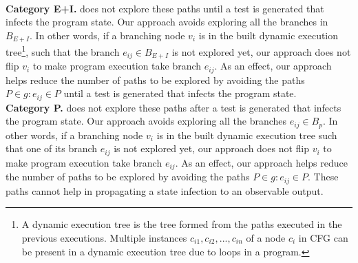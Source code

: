 \\ \textbf{Category E+I.}  does not explore these paths until a test 
is generated that infects the program state. Our approach avoids exploring all the branches in $B_{E+I}$. In other words, if a branching node $v_i$ is in the built dynamic execution tree\footnote{\scriptsize{A dynamic execution tree is the tree formed from the paths executed in the previous executions. Multiple instances $c_{i1}, c_{i2}, ..., c_{in}$ of a node $c_i$ in CFG can be present in a dynamic execution tree due to loops in a program.}}, such that the branch $e_{ij} \in B_{E+I}$ is not explored yet, our approach does not flip $v_i$ to make program execution take branch $e_{ij}$.
As an effect, our approach helps reduce the number of paths to be explored by avoiding the paths $P \in g : e_{ij} \in P$ until a test is generated that infects the program state.
\\ \textbf{Category P. }
 does not explore these paths after a test is generated that infects the program state.
Our approach avoids exploring all the branches 
$e_{ij}\in B_p$. In other words, if a branching node $v_i$ is in the built dynamic execution tree such that one of its branch $e_{ij}$ is not explored yet, our approach does not flip $v_i$ to make program execution take branch $e_{ij}$.
As an effect, our approach helps reduce the number of paths to be explored by avoiding the paths $P \in g : e_{ij} \in P$.
These paths cannot help in propagating a state infection to an observable output.

